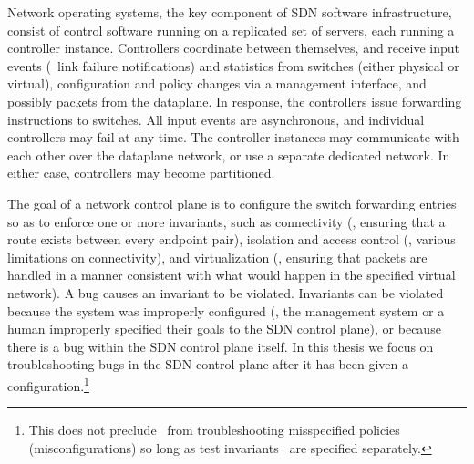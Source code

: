 %
Network operating systems, the key component of SDN software
infrastructure, consist of control software running on a replicated set of
servers, each running a controller instance. Controllers coordinate between
themselves, and receive input events (\eg~link failure notifications) and
statistics from switches (either physical or virtual), configuration and
policy changes via a management interface, and possibly packets from the dataplane.
In response, the
controllers issue forwarding instructions to switches. All input
events are asynchronous, and individual controllers may fail at any
time. The controller instances may communicate
with each other over the dataplane network, or use a separate dedicated
network. In either case, controllers may become partitioned.

The goal of a network control plane is to configure the switch forwarding entries so as to
enforce one or more invariants, such as connectivity (\ie, ensuring that a
route exists between every endpoint pair), isolation and access control (\ie, various limitations on
connectivity), and virtualization (\ie, ensuring that packets are handled
in a manner consistent with what would happen in the specified virtual
network). A bug causes an invariant to be violated. Invariants can be
violated because the system was improperly configured
(\eg, the management system \cite{quantum} or a human improperly specified their goals to the SDN control plane), or
because there is a bug within the SDN control plane itself. In this thesis we focus on troubleshooting bugs in the
SDN control plane after it has been given a configuration.\footnote{This does
not preclude \projectname~from troubleshooting misspecified policies
(misconfigurations) so long as
test invariants~\cite{hsa} are specified separately.}

